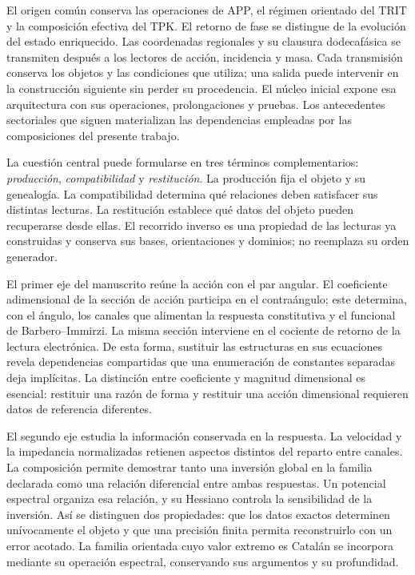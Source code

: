 El origen común conserva las operaciones de APP, el régimen orientado del
TRIT y la composición efectiva del TPK. El retorno de fase se distingue de
la evolución del estado enriquecido. Las coordenadas regionales y su
clausura dodecafásica se transmiten después a los lectores de acción,
incidencia y masa. Cada transmisión conserva los objetos y las condiciones
que utiliza; una salida puede intervenir en la construcción siguiente sin
perder su procedencia. El núcleo inicial expone esa arquitectura con sus
operaciones, prolongaciones y pruebas. Los antecedentes sectoriales que
siguen materializan las dependencias empleadas por las composiciones del
presente trabajo.

La cuestión central puede formularse en tres términos complementarios:
\emph{producción}, \emph{compatibilidad} y \emph{restitución}. La
producción fija el objeto y su genealogía. La compatibilidad determina qué
relaciones deben satisfacer sus distintas lecturas. La restitución establece
qué datos del objeto pueden recuperarse desde ellas. El recorrido inverso
es una propiedad de las lecturas ya construidas y conserva sus bases,
orientaciones y dominios; no reemplaza su orden generador.

El primer eje del manuscrito reúne la acción con el par angular. El
coeficiente adimensional de la sección de acción participa en el
contraángulo; este determina, con el ángulo, los canales que alimentan la
respuesta constitutiva y el funcional de Barbero--Immirzi. La misma sección
interviene en el cociente de retorno de la lectura electrónica. De esta
forma, sustituir las estructuras en sus ecuaciones revela dependencias
compartidas que una enumeración de constantes separadas deja implícitas.
La distinción entre coeficiente y magnitud dimensional es esencial:
restituir una razón de forma y restituir una acción dimensional requieren
datos de referencia diferentes.

El segundo eje estudia la información conservada en la respuesta. La
velocidad y la impedancia normalizadas retienen aspectos distintos del
reparto entre canales. La composición permite demostrar tanto una inversión
global en la familia declarada como una relación diferencial entre ambas
respuestas. Un potencial espectral organiza esa relación, y su Hessiano
controla la sensibilidad de la inversión. Así se distinguen dos propiedades:
que los datos exactos determinen unívocamente el objeto y que una precisión
finita permita reconstruirlo con un error acotado. La familia orientada cuyo
valor extremo es Catalán se incorpora mediante su operación espectral,
conservando sus argumentos y su profundidad.

